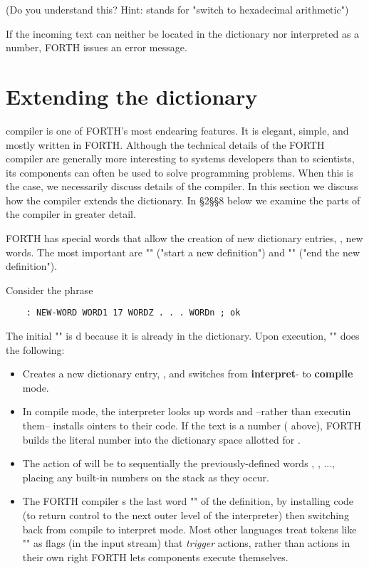 (Do you understand this? Hint:  stands for "switch to hexadecimal arithmetic")

If the incoming text can neither be located in the dictionary nor interpreted as a number, FORTH issues an error message.


\section{Extending the dictionary}

 compiler is one of FORTH's most endearing features. It is elegant, simple, and mostly written in FORTH. Although the technical details of the FORTH compiler are generally more interesting to systems developers than to scientists, its components can often be used to solve programming problems. When this is the case, we necessarily discuss details of the compiler. In this section we discuss how the compiler extends the dictionary. In \S2\S\S8 below we examine the parts of the compiler in greater detail.

FORTH has special words that allow the creation of new dictionary entries, \ie, new words. The most important are "\bc{:}" ("start a new definition") and "\bc{;}" ("end the new definition").

Consider the phrase

\begin{lstlisting}
    : NEW-WORD WORD1 17 WORDZ . . . WORDn ; ok
\end{lstlisting}

The initial "\bc{:}" is d because it is already in the dictionary. Upon execution, "\bc{:}" does the following:

\begin{itemize}
    \item Creates a new dictionary entry, , and switches from \textbf{interpret}- to \textbf{compile} mode.
    \item In compile mode, the interpreter looks up words and --rather than executin them-- installs ointers to their code. If the text is a number ( above), FORTH builds the literal number into the dictionary space allotted for .
    \item The action of  will be to  sequentially the previously-defined words , , ..., placing any built-in numbers on the stack as they occur.
    \item The FORTH compiler s the last word "\bc{;}" of the definition, by installing code (to return control to the next outer level of the interpreter) then switching back from compile to interpret mode. Most other languages treat tokens like "\bc{;}" as flags (in the input stream) that \textit{trigger} actions, rather than actions in their own right FORTH lets components execute themselves.
\end{itemize}

